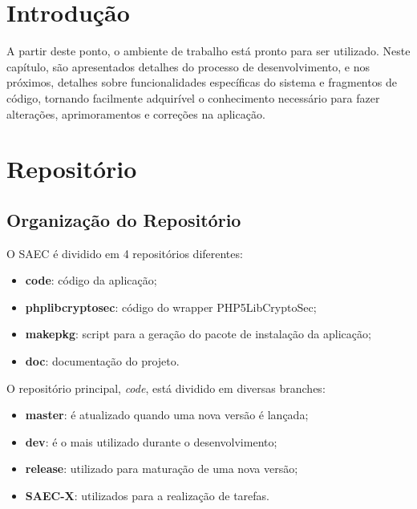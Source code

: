 
\section{Introdução}

A partir deste ponto, o ambiente de trabalho está pronto para ser utilizado. Neste capítulo, são apresentados detalhes do processo de desenvolvimento, e nos próximos, detalhes sobre funcionalidades específicas do sistema e fragmentos de código, tornando facilmente adquirível o conhecimento necessário para fazer alterações, aprimoramentos e correções na aplicação. 


\section{Repositório}

\subsection{Organização do Repositório}
O SAEC é dividido em 4 repositórios diferentes:
    \begin{itemize}
        \item \textbf{code}: código da aplicação;
        \item \textbf{phplibcryptosec}: código do wrapper PHP5LibCryptoSec;
        \item \textbf{makepkg}: script para a geração do pacote de instalação da aplicação;
        \item \textbf{doc}: documentação do projeto.
    \end{itemize}

\vspace{5mm}

O repositório principal, \textit{code}, está dividido em diversas branches:
    \begin{itemize}
        \item \textbf{master}: é atualizado quando uma nova versão é lançada;
        \item \textbf{dev}: é o mais utilizado durante o desenvolvimento;
        \item \textbf{release}: utilizado para maturação de uma nova versão;
        \item \textbf{SAEC-X}: utilizados para a realização de tarefas.
    \end{itemize}

